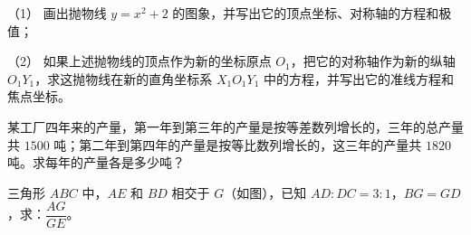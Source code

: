 \begin{question}

（1） 画出抛物线 $y=x^2+2$ 的图象，并写出它的顶点坐标、对称轴的方程和极值；

（2） 如果上述抛物线的顶点作为新的坐标原点 $O_1$，把它的对称轴作为新的纵轴 $O_1Y_1$，求这抛物线在新的直角坐标系 $X_1O_1Y_1$ 中的方程，并写出它的准线方程和焦点坐标。

\end{question}
\begin{question}
某工厂四年来的产量，第一年到第三年的产量是按等差数列增长的，三年的总产量共 $1500$ 吨；第二年到第四年的产量是按等比数列增长的，这三年的产量共 $1820$ 吨。求每年的产量各是多少吨？

\Needspace{0.4\textheight}
\end{question}
\begin{question}
三角形 $ABC$ 中，$AE$ 和 $BD$ 相交于 $G$（如图），已知 $AD:DC=3:1$，$BG=GD$，求：$\dfrac{AG}{GE}$。
\nopagebreak[4]
\begin{center}\end{center}
\nopagebreak[4]

\end{question}